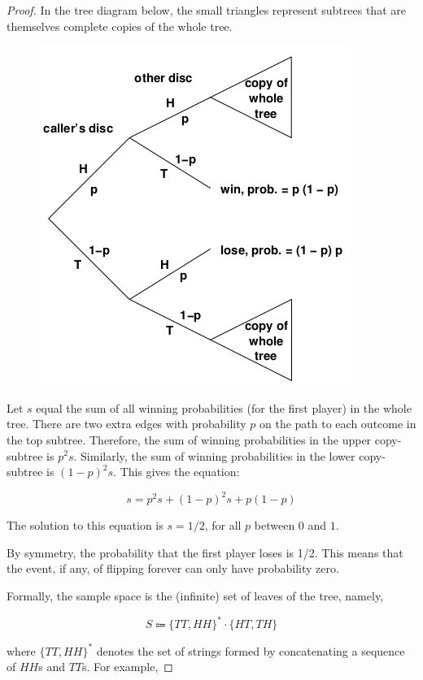 \documentclass[14pt]{extarticle}
\begin{document}
\begin{proof} In the tree diagram below, the small triangles represent subtrees that are themselves complete copies of the whole tree.

\begin{figure}[ht!]
\centering
\includegraphics[scale=0.6]{infinite-tree.png}
\end{figure}

Let $s$ equal the sum of all winning probabilities (for the first player) in the whole tree. There are two extra edges with probability $p$ on the path to each outcome in the top subtree. Therefore, the sum of winning probabilities in the upper copy-subtree is $p^2 s$. Similarly, the sum of winning probabilities in the lower copy-subtree is $(1 - p)^2s$. This gives the equation:

$$
s = p^2s + (1-p)^2s + p(1-p)
$$

The solution to this equation is $s = 1/2$, for all $p$ between $0$ and $1$.

By symmetry, the probability that the first player loses is 1/2. This means that the event, if any, of flipping forever can only have probability zero.

Formally, the sample space is the (infinite) set of leaves of the tree, namely,

$$
S \Coloneqq \{TT, HH\}^* \cdot \{HT, TH\}
$$

where $\{TT, HH\}^*$ denotes the set of strings formed by concatenating a sequence of $HH$s and $TT$s. For example,


\end{proof}
\end{document}
